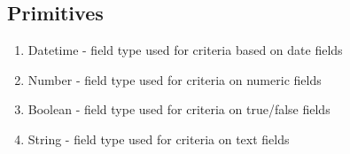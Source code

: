 \subsection{Primitives}
\begin{enumerate}
\item Datetime - field type used for criteria based on date fields
\item Number - field type used for criteria on numeric fields
\item Boolean - field type used for criteria on true/false fields
\item String - field type used for criteria on text fields
\end{enumerate}